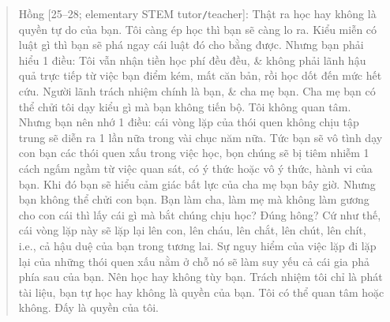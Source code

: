 \documentclass[12pt,oneside]{book}
\begin{document}
\begin{quote}
	{\sf Hồng [25--28; elementary STEM tutor{\tt/}teacher]}: Thật ra học hay không là quyền tự do của bạn. Tôi càng ép học thì bạn sẽ càng lo ra. Kiểu miễn có luật gì thì bạn sẽ phá ngay cái luật đó cho bằng được. Nhưng bạn phải hiểu 1 điều: Tôi vẫn nhận tiền học phí đều đều, \& không phải lãnh hậu quả trực tiếp từ việc bạn điểm kém, mất căn bản, rồi học dốt đến mức hết cứu. Người lãnh trách nhiệm chính là bạn, \& cha mẹ bạn. Cha mẹ bạn có thể chửi tôi dạy kiểu gì mà bạn không tiến bộ. Tôi không quan tâm. Nhưng bạn nên nhớ 1 điều: cái vòng lặp của thói quen không chịu tập trung sẽ diễn ra 1 lần nữa trong vài chục năm nữa. Tức bạn sẽ vô tình dạy con bạn các thói quen xấu trong việc học, bọn chúng sẽ bị tiêm nhiễm 1 cách ngấm ngầm từ việc quan sát, có ý thức hoặc vô ý thức, hành vi của bạn. Khi đó bạn sẽ hiểu cảm giác bất lực của cha mẹ bạn bây giờ. Nhưng bạn không thể chửi con bạn. Bạn làm cha, làm mẹ mà không làm gương cho con cái thì lấy cái gì mà bắt chúng chịu học? Đúng hông? Cứ như thế, cái vòng lặp này sẽ lặp lại lên con, lên cháu, lên chắt, lên chút, lên chít, i.e., cả hậu duệ của bạn trong tương lai. Sự nguy hiểm của việc lặp đi lặp lại của những thói quen xấu nằm ở chỗ nó sẽ làm suy yếu cả cái gia phả phía sau của bạn. Nên học hay không tùy bạn. Trách nhiệm tôi chỉ là phát tài liệu, bạn tự học hay không là quyền của bạn. Tôi có thể quan tâm hoặc không. Đấy là quyền của tôi.
\end{quote}
\end{document}
